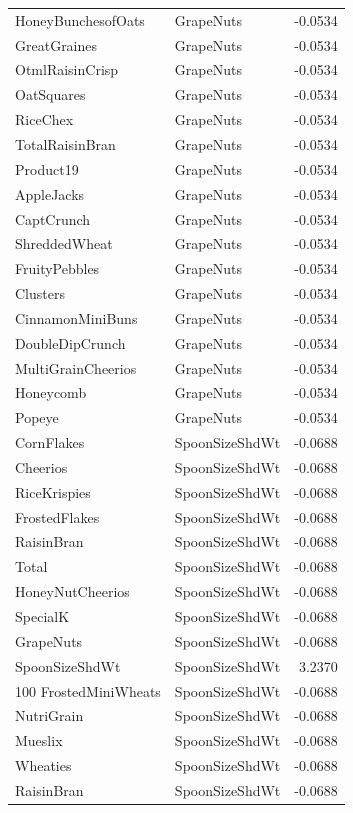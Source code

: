 \begin{longtable}{llr}
HoneyBunchesofOats & GrapeNuts & -0.0534 \\
GreatGraines & GrapeNuts & -0.0534 \\
OtmlRaisinCrisp & GrapeNuts & -0.0534 \\
OatSquares & GrapeNuts & -0.0534 \\
RiceChex & GrapeNuts & -0.0534 \\
TotalRaisinBran & GrapeNuts & -0.0534 \\
Product19 & GrapeNuts & -0.0534 \\
AppleJacks & GrapeNuts & -0.0534 \\
CaptCrunch & GrapeNuts & -0.0534 \\
ShreddedWheat & GrapeNuts & -0.0534 \\
FruityPebbles & GrapeNuts & -0.0534 \\
Clusters & GrapeNuts & -0.0534 \\
CinnamonMiniBuns & GrapeNuts & -0.0534 \\
DoubleDipCrunch & GrapeNuts & -0.0534 \\
MultiGrainCheerios & GrapeNuts & -0.0534 \\
Honeycomb & GrapeNuts & -0.0534 \\
Popeye & GrapeNuts & -0.0534 \\
CornFlakes & SpoonSizeShdWt & -0.0688 \\
Cheerios & SpoonSizeShdWt & -0.0688 \\
RiceKrispies & SpoonSizeShdWt & -0.0688 \\
FrostedFlakes & SpoonSizeShdWt & -0.0688 \\
RaisinBran & SpoonSizeShdWt & -0.0688 \\
Total & SpoonSizeShdWt & -0.0688 \\
HoneyNutCheerios & SpoonSizeShdWt & -0.0688 \\
SpecialK & SpoonSizeShdWt & -0.0688 \\
GrapeNuts & SpoonSizeShdWt & -0.0688 \\
SpoonSizeShdWt & SpoonSizeShdWt & 3.2370 \\
100%
FrostedMiniWheats & SpoonSizeShdWt & -0.0688 \\
NutriGrain & SpoonSizeShdWt & -0.0688 \\
Mueslix & SpoonSizeShdWt & -0.0688 \\
Wheaties & SpoonSizeShdWt & -0.0688 \\
RaisinBran & SpoonSizeShdWt & -0.0688 \\

\end{longtable}
